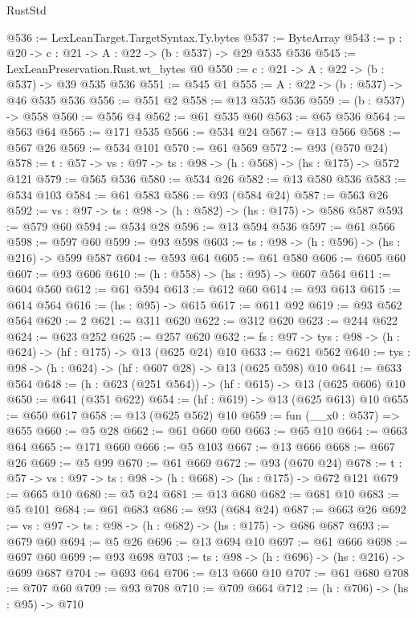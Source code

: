 \begin{lexlean}{RustStd}
\begin{coremodule}
@536 := LexLeanTarget.TargetSyntax.Ty.bytes
@537 := ByteArray
@543 := {p : @20} -> {c : @21} -> {A : @22} -> (b : @537) -> @29 @535 @536
@545 := LexLeanPreservation.Rust.wt_bytes @0
@550 := {c : @21} -> {A : @22} -> (b : @537) -> @39 @535 @536
@551 := @545 @1
@555 := {A : @22} -> (b : @537) -> @46 @535 @536
@556 := @551 @2
@558 := @13 @535 @536
@559 := (b : @537) -> @558
@560 := @556 @4
@562 := @61 @535 @60
@563 := @65 @536
@564 := @563 @64
@565 := @171 @535
@566 := @534 @24
@567 := @13 @566
@568 := @567 @26
@569 := @534 @101
@570 := @61 @569
@572 := @93 (@570 @24)
@578 := {t : @57} -> {vs : @97} -> {ts : @98} -> (h : @568) -> (hs : @175) -> @572 @121
@579 := @565 @536
@580 := @534 @26
@582 := @13 @580 @536
@583 := @534 @103
@584 := @61 @583
@586 := @93 (@584 @24)
@587 := @563 @26
@592 := {vs : @97} -> {ts : @98} -> (h : @582) -> (hs : @175) -> @586 @587
@593 := @579 @60
@594 := @534 @28
@596 := @13 @594 @536
@597 := @61 @566
@598 := @597 @60
@599 := @93 @598
@603 := {ts : @98} -> (h : @596) -> (hs : @216) -> @599 @587
@604 := @593 @64
@605 := @61 @580
@606 := @605 @60
@607 := @93 @606
@610 := (h : @558) -> (hs : @95) -> @607 @564
@611 := @604 @560
@612 := @61 @594
@613 := @612 @60
@614 := @93 @613
@615 := @614 @564
@616 := (hs : @95) -> @615
@617 := @611 @92
@619 := @93 @562 @564
@620 := 2
@621 := @311 @620
@622 := @312 @620
@623 := @244 @622
@624 := @623 @252
@625 := @257 @620
@632 := {fs : @97} -> {tys : @98} -> (h : @624) -> (hf : @175) -> @13 (@625 @24) @10
@633 := @621 @562
@640 := {tys : @98} -> (h : @624) -> (hf : @607 @28) -> @13 (@625 @598) @10
@641 := @633 @564
@648 := (h : @623 (@251 @564)) -> (hf : @615) -> @13 (@625 @606) @10
@650 := @641 (@351 @622)
@654 := (hf : @619) -> @13 (@625 @613) @10
@655 := @650 @617
@658 := @13 (@625 @562) @10
@659 := fun (__x0 : @537) => @655
@660 := @5 @28
@662 := @61 @660 @60
@663 := @65 @10
@664 := @663 @64
@665 := @171 @660
@666 := @5 @103
@667 := @13 @666
@668 := @667 @26
@669 := @5 @99
@670 := @61 @669
@672 := @93 (@670 @24)
@678 := {t : @57} -> {vs : @97} -> {ts : @98} -> (h : @668) -> (hs : @175) -> @672 @121
@679 := @665 @10
@680 := @5 @24
@681 := @13 @680
@682 := @681 @10
@683 := @5 @101
@684 := @61 @683
@686 := @93 (@684 @24)
@687 := @663 @26
@692 := {vs : @97} -> {ts : @98} -> (h : @682) -> (hs : @175) -> @686 @687
@693 := @679 @60
@694 := @5 @26
@696 := @13 @694 @10
@697 := @61 @666
@698 := @697 @60
@699 := @93 @698
@703 := {ts : @98} -> (h : @696) -> (hs : @216) -> @699 @687
@704 := @693 @64
@706 := @13 @660 @10
@707 := @61 @680
@708 := @707 @60
@709 := @93 @708
@710 := @709 @664
@712 := (h : @706) -> (hs : @95) -> @710

\end{coremodule}
\end{lexlean}
